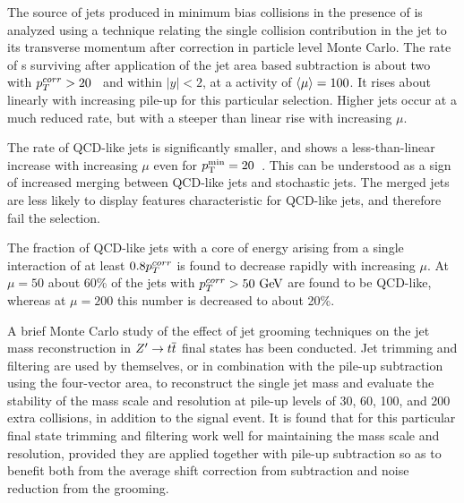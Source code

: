 The source of jets produced in minimum bias collisions in the presence of \pu{} is analyzed using a technique relating the single collision contribution in the jet to its transverse momentum after \pu{} correction in particle level Monte Carlo. The rate of \pujet s surviving after application of the jet area based \pu{} subtraction is about two with $p_T^{corr} > 20$~\GeV{} and within $|y|<2$, at a \pu{} activity of $\langle\mu\rangle = 100$. It rises about linearly with increasing pile-up for this particular selection. Higher \pT{} jets occur at a much reduced rate, but with a steeper than linear rise with increasing $\mu$. 

The rate of QCD-like jets is significantly smaller, and shows a less-than-linear increase with increasing $\mu$ even for $p_{\mathrm{T}}^{\mathrm{min}} = 20$~\GeV. This can be understood as a sign of increased merging between QCD-like jets and stochastic jets. The merged jets are less likely to display features characteristic for QCD-like jets, and therefore fail the selection. 

The fraction of QCD-like jets with a core of energy arising from a single \pp{} interaction of at least $0.8 p_T^{corr}$ is found to decrease rapidly with
increasing $\mu$. At $\mu=50$ about 60\% of the \pu{} jets with $\ptcorr > 50\GeV$ are found to be QCD-like, whereas at $\mu=200$ this number is decreased to 
about 20\%.



A brief Monte Carlo study of the effect of jet grooming techniques on
the jet mass reconstruction in $Z' \to t\overline{t}$ final states has
been conducted. Jet trimming and filtering are used by themselves, or
in combination with the pile-up subtraction using the four-vector
area, to reconstruct the single jet mass and evaluate the stability of
the mass scale and resolution at pile-up levels of 30, 60, 100, and
200 extra \pp{} collisions, in addition to the signal event. It is
found that for this particular final state trimming and filtering work
well for maintaining the mass scale and resolution, provided they are
applied together with pile-up subtraction so as to benefit both from
the average shift correction from subtraction and noise reduction from
the grooming. 
%

